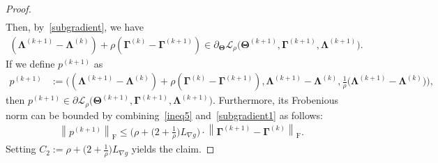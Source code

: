 \documentclass[alpha-refs]{wiley-article}
\begin{document}
\begin{proof}
\begin{align*}
\end{align*}
Then, by~\eqref{subgradient}, we have
\begin{align*}
    (\boldsymbol{\Lambda}^{(k+1)} - \boldsymbol{\Lambda}^{(k)}) + \rho (\boldsymbol{\Gamma}^{(k)} - \boldsymbol{\Gamma}^{(k+1)} )
    \in \partial_{\boldsymbol{\Theta}}\mathcal{L}_{\rho} \big( \boldsymbol{\Theta}^{(k+1)},\boldsymbol{\Gamma}^{(k+1)},\boldsymbol{\Lambda}^{(k+1)} \big).
\end{align*}
If we define $p^{(k+1)}$ as
\begin{align} \label{subgradient1}
    p^{(k+1)}
    &:=\bigg( (\boldsymbol{\Lambda}^{(k+1)} - \boldsymbol{\Lambda}^{(k)}) + \rho (\boldsymbol{\Gamma}^{(k)} - \boldsymbol{\Gamma}^{(k+1)} ),
    \boldsymbol{\Lambda}^{(k+1)} - \boldsymbol{\Lambda}^{(k)}, \frac{1}{\rho} \big( \boldsymbol{\Lambda}^{(k+1)} - \boldsymbol{\Lambda}^{(k)} \big) \bigg),
\end{align}
then $p^{(k+1)}\in\partial \mathcal{L}_{\rho} \big( \boldsymbol{\Theta}^{(k+1)},\boldsymbol{\Gamma}^{(k+1)},\boldsymbol{\Lambda}^{(k+1)} \big)$.
Furthermore, its Frobenious norm can be bounded by combining~\eqref{ineq5} and~\eqref{subgradient1} as follows:
\begin{align*}
    \left\| p^{(k+1)} \right\|_{\text{F}} \leq
    \bigg( \rho + \big(2+\frac{1}{\rho}\big)L_{\nabla g} \bigg) \cdot
    \left\| \boldsymbol{\Gamma}^{(k+1)} - \boldsymbol{\Gamma}^{(k)} \right\|_{\text{F}}.
\end{align*}
Setting $C_{2}:=\rho + \big(2+\frac{1}{\rho}\big)L_{\nabla g}$ yields the claim.
\end{proof}
\end{document}
